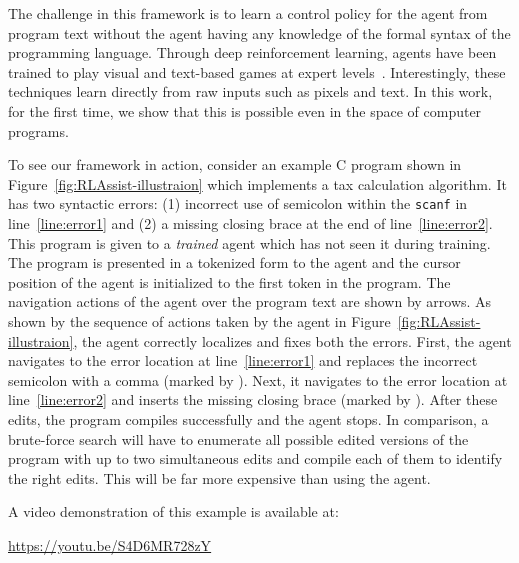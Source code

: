 \documentclass{article}
\newcommand{\code}[1]{\texttt{#1}}
\begin{document}
The challenge in this framework is to learn
a control policy for the agent from program text without
the agent having any knowledge of the formal syntax of the programming language.
Through deep reinforcement learning, agents have been trained to 
play visual and text-based games at expert 
levels~\cite{mnih2015human,narasimhan2015language,wu2016training}. Interestingly, these
techniques learn directly from raw inputs such as pixels and text.
In this work, for the first time, we show that
this is possible even in the space of computer programs.

To see our framework in action, consider an example C program shown in Figure~\ref{fig:RLAssist-illustraion} which implements a tax calculation algorithm.
It has two syntactic errors: (1) incorrect use of semicolon within the \code{scanf} in line~\ref{line:error1} and (2) a missing closing brace at the end of line~\ref{line:error2}.
This program is given to a \emph{trained} agent which has not seen it during training.
The program is presented in a tokenized form to the agent and
the cursor position of the agent is initialized to the first token in the program.
The navigation actions of the agent over the program text are shown by arrows.
As shown by the sequence of actions taken by the agent in Figure~\ref{fig:RLAssist-illustraion}, the agent correctly localizes and fixes both the errors.
First, the agent navigates to the error location at line~\ref{line:error1} and replaces the incorrect semicolon
with a comma (marked by {}).
Next, it navigates to the error location at line~\ref{line:error2} and inserts the missing closing brace (marked by {}).
After these edits, the program compiles successfully and the agent stops.
In comparison, a brute-force search will have to enumerate all possible
edited versions of the program with up to two simultaneous edits and compile each of them
to identify the right edits. This will be far more expensive than using
the agent.

A video demonstration of this example is available at:
\begin{center}
\url{https://youtu.be/S4D6MR728zY}
\end{center}
\end{document}
